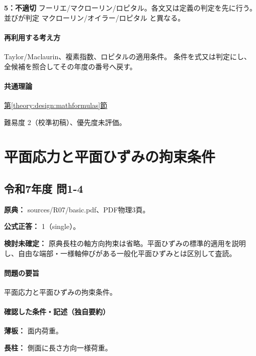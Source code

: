 \noindent\textbf{5：不適切} フーリエ/マクローリン/ロピタル。各文又は定義の判定を先に行う。並びが判定 マクローリン/オイラー/ロピタル と異なる。\par

\paragraph{再利用する考え方} Taylor/Maclaurin、複素指数、ロピタルの適用条件。 条件を式又は判定にし、全候補を照合してその年度の番号へ戻す。

\paragraph{共通理論} \hyperref[theory:design:mathformulas]{第\ref*{theory:design:mathformulas}節}

\par 難易度 2（校準初稿）、優先度未評価。

\section{平面応力と平面ひずみの拘束条件}

\subsection{令和7年度 問1-4}
\label{q:r07-reg-basic-1-4}

\noindent\textbf{原典：} sources/R07/basic.pdf、PDF物理3頁。

\textbf{公式正答：} 1（single）。

\par\textbf{検討未確定：} 原典長柱の軸方向拘束は省略。平面ひずみの標準的適用を説明し、自由な端部・一様軸伸びがある一般化平面ひずみとは区別して査読。

\paragraph{問題の要旨} 平面応力と平面ひずみの拘束条件。

\paragraph{確認した条件・記述（独自要約）}\mbox{}\par

\noindent\textbf{薄板：} 面内荷重。\par

\noindent\textbf{長柱：} 側面に長さ方向一様荷重。\par

